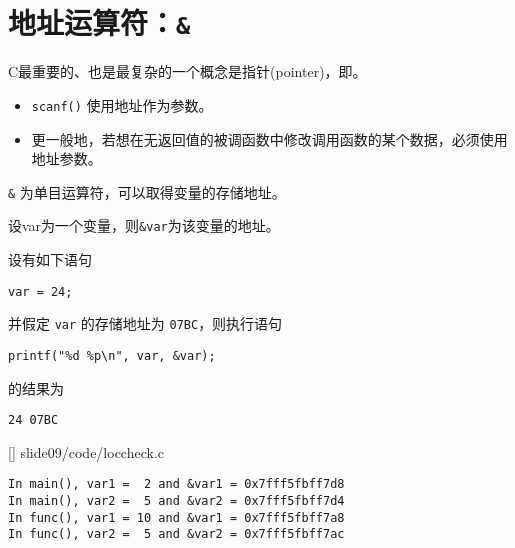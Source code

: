 \section{地址运算符：\lstinline|&|}

\begin{frame}[fragile]\ft{\secname}
C最重要的、也是最复杂的一个概念是指针(pointer)，即。

\end{frame}

\begin{frame}[fragile]\ft{\secname}
\begin{itemize}
\item
\lstinline|scanf()| 使用地址作为参数。\\[0.1in]
\item
更一般地，若想在无返回值的被调函数中修改调用函数的某个数据，必须使用地址参数。
\end{itemize}
\end{frame}

\begin{frame}[fragile]\ft{\secname}
\lstinline|&| 为单目运算符，可以取得变量的存储地址。 
\pause 
\vspace{0.4in}

设var为一个变量，则\lstinline|&var|为该变量的地址。

\vspace{0.1in}


\end{frame}

\begin{frame}[fragile]\ft{\secname}
设有如下语句
\begin{lstlisting}
var = 24;
\end{lstlisting}
并假定 \lstinline|var| 的存储地址为 \lstinline|07BC|，则执行语句
\begin{lstlisting}
printf("%d %p\n", var, &var);
\end{lstlisting}
的结果为
\begin{lstlisting}
24 07BC
\end{lstlisting}
\end{frame}

\begin{frame}\ft{\secname}
  
  []
  {slide09/code/loccheck.c}
\end{frame}


\begin{frame}[fragile]\ft{\secname}
\begin{lstlisting}[backgroundcolor=\color{red!10}]
In main(), var1 =  2 and &var1 = 0x7fff5fbff7d8
In main(), var2 =  5 and &var2 = 0x7fff5fbff7d4
In func(), var1 = 10 and &var1 = 0x7fff5fbff7a8
In func(), var2 =  5 and &var2 = 0x7fff5fbff7ac
\end{lstlisting}
\end{frame}

